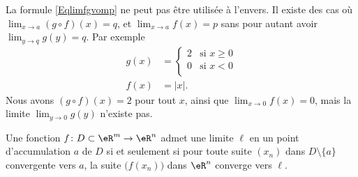 \begin{remark}
	La formule \eqref{Eqlimfgvomp} ne peut pas être utilisée à l'envers. Il existe des cas où $\lim_{x\to a} (g\circ f)(x)=q$, et $\lim_{x\to a} f(x)=p$ sans pour autant avoir $\lim_{y\to q} g(y)=q$. Par exemple
	\begin{subequations}
		\begin{align}
			g(x)&=\begin{cases}
				2	&	\text{si }x\geq0\\
				0	&	 \text{si }x<0\\
			\end{cases}\\
			f(x)&=| x |.
		\end{align}
	\end{subequations}
	Nous avons $(g\circ f)(x)=2$ pour tout $x$, ainsi que $\lim_{x\to 0} f(x)=0$, mais la limite $\lim_{y\to 0} g(y)$ n'existe pas.
\end{remark}


\begin{theorem}		\label{ThoLimSuite}
	Une fonction $f\colon D\subset\eR^m\to \eR^n$ admet une limite $\ell$ en un point d'accumulation $a$ de $D$ si et seulement si pour toute suite $(x_n)$ dans $D\setminus\{ a \}$ convergente vers $a$, la suite $\big( f(x_n) \big)$ dans $\eR^n$ converge vers $\ell$.
\end{theorem}

